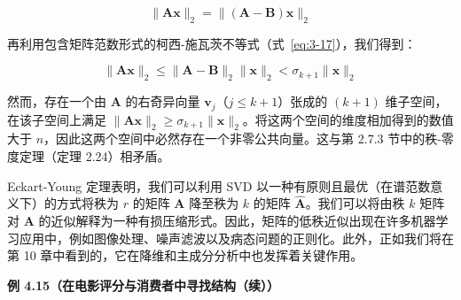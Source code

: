 \begin{equation}
\|\boldsymbol{A} \boldsymbol{x}\|_2 = \|(\boldsymbol{A} - \boldsymbol{B})\boldsymbol{x}\|_2
\tag{4.98}\label{eq:4-98}
\end{equation}

再利用包含矩阵范数形式的柯西-施瓦茨不等式（式~\eqref{eq:3-17}），我们得到：

\begin{equation}
\|\boldsymbol{A} \boldsymbol{x}\|_2 \leqslant \|\boldsymbol{A} - \boldsymbol{B}\|_2 \|\boldsymbol{x}\|_2 < \sigma_{k+1} \|\boldsymbol{x}\|_2
\tag{4.99}\label{eq:4-99}
\end{equation}

然而，存在一个由 $ \boldsymbol{A} $ 的右奇异向量 $ \boldsymbol{v}_j $（$ j \leqslant k + 1 $）张成的 $ (k + 1) $ 维子空间，在该子空间上满足 $ \|\boldsymbol{A} \boldsymbol{x}\|_2 \geqslant \sigma_{k+1} \|\boldsymbol{x}\|_2 $。将这两个空间的维度相加得到的数值大于 $ n $，因此这两个空间中必然存在一个非零公共向量。这与第 2.7.3 节中的秩-零度定理（定理 2.24）相矛盾。

Eckart-Young 定理表明，我们可以利用 SVD 以一种有原则且最优（在谱范数意义下）的方式将秩为 $ r $ 的矩阵 $ \boldsymbol{A} $ 降至秩为 $ k $ 的矩阵 $ \widehat{\boldsymbol{A}} $。我们可以将由秩 $ k $ 矩阵对 $ \boldsymbol{A} $ 的近似解释为一种有损压缩形式。因此，矩阵的低秩近似出现在许多机器学习应用中，例如图像处理、噪声滤波以及病态问题的正则化。此外，正如我们将在第 10 章中看到的，它在降维和主成分分析中也发挥着关键作用。

\begin{notebox}
\textbf{例 4.15（在电影评分与消费者中寻找结构（续））}
\end{notebox}

